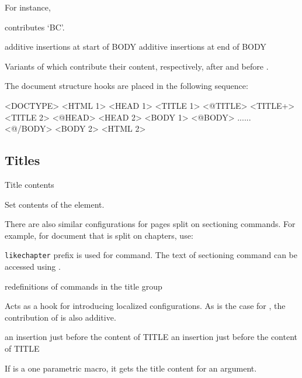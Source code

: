 For instance,

\begin{texsource}
\end{texsource}

contributes `BC'.


 {additive insertions at start of BODY}\EndDoc
{} {additive insertions at end of BODY}\EndDoc

   Variants of  which contribute their content,
   respectively, after  and before .


The document structure hooks are placed in the following sequence:


\begin{texsource}
<DOCTYPE>
<HTML 1>
  <HEAD 1>
     <TITLE 1>
        <@TITLE>
        <TITLE+>
     <TITLE 2>
     <@HEAD>
  <HEAD 2>
  <BODY 1>
  <@BODY>
  ......
  <@/BODY>
  <BODY 2>
<HTML 2>
\end{texsource}


\subsection{Titles}

 {Title contents}\EndDoc

Set contents of the  element.

There are also similar configurations for pages split on sectioning commands. For example, for document that
is split on chapters, use:

\begin{texsource}
\end{texsource}

\texttt{likechapter} prefix is used for \texcommand{\chapter*} command. The text of sectioning command
can be accessed using .

 {redefinitions of commands in the title group}\EndDoc

Acts as a hook for introducing localized configurations. As is the case for
, the contribution of  is also
additive.

 {an insertion just before the content of TITLE}\EndDoc
{} {an insertion just before the content of TITLE}\EndDoc

If  is a one parametric macro, it gets the title content for an
argument.

